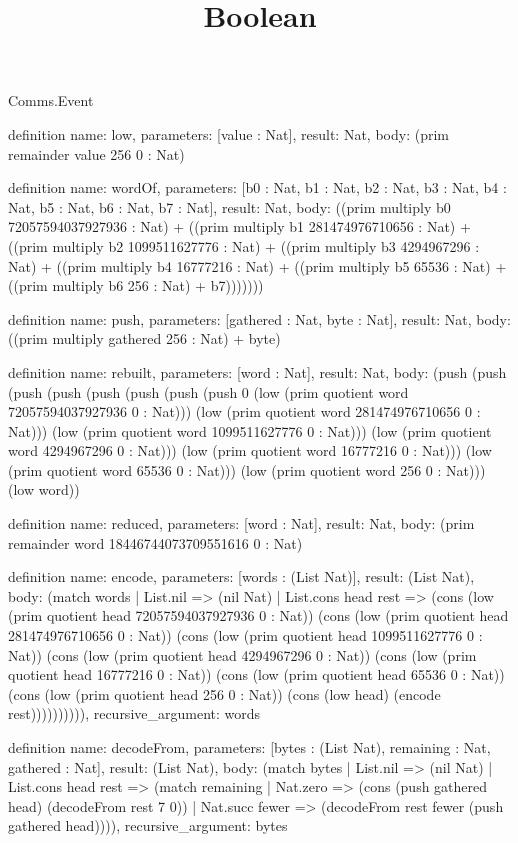 \begin{lexlean}{Comms.Event}
\title{Boolean}
\begin{semanticmodule}
definition{
  name: low,
  parameters: [value : Nat],
  result: Nat,
  body: (prim remainder value 256 0 : Nat)
}

definition{
  name: wordOf,
  parameters: [b0 : Nat, b1 : Nat, b2 : Nat, b3 : Nat, b4 : Nat, b5 : Nat, b6 : Nat, b7 : Nat],
  result: Nat,
  body: ((prim multiply b0 72057594037927936 : Nat) + ((prim multiply b1 281474976710656 : Nat) + ((prim multiply b2 1099511627776 : Nat) + ((prim multiply b3 4294967296 : Nat) + ((prim multiply b4 16777216 : Nat) + ((prim multiply b5 65536 : Nat) + ((prim multiply b6 256 : Nat) + b7)))))))
}

definition{
  name: push,
  parameters: [gathered : Nat, byte : Nat],
  result: Nat,
  body: ((prim multiply gathered 256 : Nat) + byte)
}

definition{
  name: rebuilt,
  parameters: [word : Nat],
  result: Nat,
  body: (push (push (push (push (push (push (push (push 0 (low (prim quotient word 72057594037927936 0 : Nat))) (low (prim quotient word 281474976710656 0 : Nat))) (low (prim quotient word 1099511627776 0 : Nat))) (low (prim quotient word 4294967296 0 : Nat))) (low (prim quotient word 16777216 0 : Nat))) (low (prim quotient word 65536 0 : Nat))) (low (prim quotient word 256 0 : Nat))) (low word))
}

definition{
  name: reduced,
  parameters: [word : Nat],
  result: Nat,
  body: (prim remainder word 18446744073709551616 0 : Nat)
}

definition{
  name: encode,
  parameters: [words : (List Nat)],
  result: (List Nat),
  body: (match words
    | List.nil => (nil Nat)
    | List.cons head rest => (cons (low (prim quotient head 72057594037927936 0 : Nat)) (cons (low (prim quotient head 281474976710656 0 : Nat)) (cons (low (prim quotient head 1099511627776 0 : Nat)) (cons (low (prim quotient head 4294967296 0 : Nat)) (cons (low (prim quotient head 16777216 0 : Nat)) (cons (low (prim quotient head 65536 0 : Nat)) (cons (low (prim quotient head 256 0 : Nat)) (cons (low head) (encode rest)))))))))),
  recursive_argument: words
}

definition{
  name: decodeFrom,
  parameters: [bytes : (List Nat), remaining : Nat, gathered : Nat],
  result: (List Nat),
  body: (match bytes
    | List.nil => (nil Nat)
    | List.cons head rest => (match remaining
      | Nat.zero => (cons (push gathered head) (decodeFrom rest 7 0))
      | Nat.succ fewer => (decodeFrom rest fewer (push gathered head)))),
  recursive_argument: bytes
}


\end{semanticmodule}
\end{lexlean}
